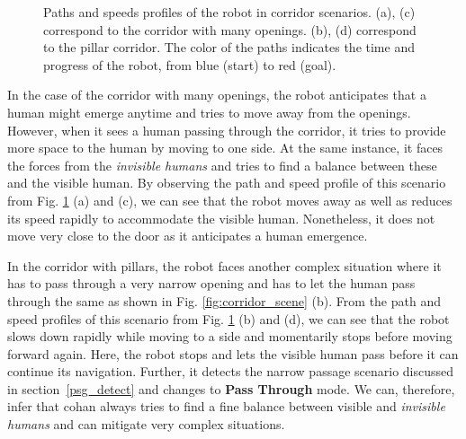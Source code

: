 \begin{figure}[b!]
\begin{subfigure}{0.45\columnwidth}
\end{subfigure}
\caption{Paths and speeds profiles of the robot in corridor scenarios. (a), (c) correspond to the corridor with many openings. (b), (d) correspond to the pillar corridor. The color of the paths indicates the time and progress of the robot, from blue (start) to red (goal).}
\label{fig:corridors}
\end{figure} 
In the case of the corridor with many openings, the robot anticipates that a human might emerge anytime and tries to move away from the openings. However, when it sees a human passing through the corridor, it tries to provide more space to the human by moving to one side. At the same instance, it faces the forces from the \textit{invisible humans} and tries to find a balance between these and the visible human. By observing the path and speed profile of this scenario from Fig. \ref{fig:corridors} (a) and (c), we can see that the robot moves away as well as reduces its speed rapidly to accommodate the visible human. Nonetheless, it does not move very close to the door as it anticipates a human emergence. 
 
In the corridor with pillars, the robot faces another complex situation where it has to pass through a very narrow opening and has to let the human pass through the same as shown in Fig. \ref{fig:corridor_scene} (b). From the path and speed profiles of this scenario from Fig. \ref{fig:corridors} (b) and (d), we can see that the robot slows down rapidly while moving to a side and momentarily stops before moving forward again. Here, the robot stops and lets the visible human pass before it can continue its navigation. Further, it detects the narrow passage scenario discussed in section~\ref{psg_detect} and changes to \textbf{Pass Through} mode. We can, therefore, infer that \acrshort{cohan} always tries to find a fine balance between visible and \textit{invisible humans} and can mitigate very complex situations.
 
